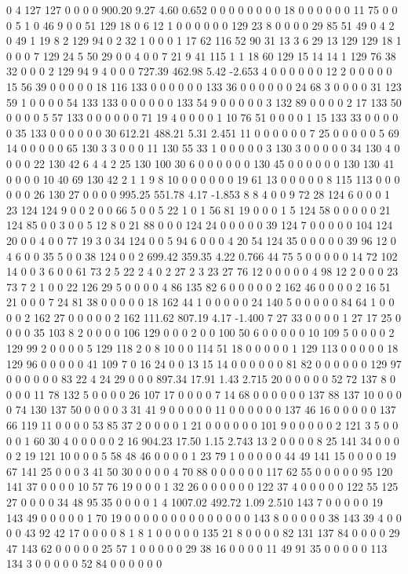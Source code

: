  0 4 127 127 0 0 0 0
900.20 9.27 4.60 0.652
 0 0 0 0 0 0 0 0 18 0 0 0 0 0 0 11 75 0 0 0
 5 1 0 46 9 0 0 51 129 18 0 6 12 1 0 0 0 0 0 0
 129 23 8 0 0 0 0 29 85 51 49 0 4 2 0 49 1 19 8 2
 129 94 0 2 32 1 0 0 0 1 17 62 116 52 90 31 13 3 6 29
 13 129 129 18 1 0 0 0 7 129 24 5 50 29 0 0 4 0 0 7
 21 9 41 115 1 1 18 60 129 15 14 14 1 129 76 38 32 0 0 0
 2 129 94 9 4 0 0 0
727.39 462.98 5.42 -2.653
 4 0 0 0 0 0 0 12 2 0 0 0 0 0 15 56 39 0 0 0
 0 0 18 116 133 0 0 0 0 0 0 133 36 0 0 0 0 0 0 24
 68 3 0 0 0 0 31 123 59 1 0 0 0 0 54 133 133 0 0 0
 0 0 0 133 54 9 0 0 0 0 0 3 132 89 0 0 0 0 2 17
 133 50 0 0 0 0 5 57 133 0 0 0 0 0 0 71 19 4 0 0
 0 0 1 10 76 51 0 0 0 0 1 15 133 33 0 0 0 0 0 35
 133 0 0 0 0 0 0 30
612.21 488.21 5.31 2.451
 11 0 0 0 0 0 0 7 25 0 0 0 0 0 5 69 14 0 0 0
 0 0 65 130 3 3 0 0 0 11 130 55 33 1 0 0 0 0 0 3
 130 3 0 0 0 0 0 34 130 4 0 0 0 0 22 130 42 6 4 4
 2 25 130 100 30 6 0 0 0 0 0 0 130 45 0 0 0 0 0 0
 130 130 41 0 0 0 0 10 40 69 130 42 2 1 1 9 8 10 0 0
 0 0 0 0 19 61 13 0 0 0 0 0 8 115 113 0 0 0 0 0
 0 26 130 27 0 0 0 0
995.25 551.78 4.17 -1.853
 8 8 4 0 0 9 72 28 124 6 0 0 0 1 23 124 124 9 0 0
 2 0 0 66 5 0 0 5 22 1 0 1 56 81 19 0 0 0 1 5
 124 58 0 0 0 0 0 21 124 85 0 0 3 0 0 5 12 8 0 21
 88 0 0 0 124 24 0 0 0 0 0 39 124 7 0 0 0 0 0 104
 124 20 0 0 4 0 0 77 19 3 0 34 124 0 0 5 94 6 0 0
 0 4 20 54 124 35 0 0 0 0 0 39 96 12 0 4 6 0 0 35
 5 0 0 38 124 0 0 2
699.42 359.35 4.22 0.766
 44 75 5 0 0 0 0 0 14 72 102 14 0 0 3 6 0 0 61 73
 2 5 22 2 4 0 2 27 2 3 23 27 76 12 0 0 0 0 0 4
 98 12 2 0 0 0 23 73 7 2 1 0 0 22 126 29 5 0 0 0
 0 4 86 135 82 6 0 0 0 0 0 2 162 46 0 0 0 0 2 16
 51 21 0 0 0 7 24 81 38 0 0 0 0 0 18 162 44 1 0 0
 0 0 0 24 140 5 0 0 0 0 0 84 64 1 0 0 0 0 2 162
 27 0 0 0 0 0 2 162
111.62 807.19 4.17 -1.400
 7 27 33 0 0 0 0 1 27 17 25 0 0 0 0 35 103 8 2 0
 0 0 0 106 129 0 0 0 2 0 0 100 50 6 0 0 0 0 0 10
 109 5 0 0 0 0 2 129 99 2 0 0 0 0 5 129 118 2 0 8
 10 0 0 114 51 18 0 0 0 0 0 1 129 113 0 0 0 0 0 18
 129 96 0 0 0 0 0 41 109 7 0 16 24 0 0 13 15 14 0 0
 0 0 0 0 81 82 0 0 0 0 0 0 129 97 0 0 0 0 0 0
 83 22 4 24 29 0 0 0
897.34 17.91 1.43 2.715
 20 0 0 0 0 0 52 72 137 8 0 0 0 0 11 78 132 5 0 0
 0 0 26 107 17 0 0 0 0 7 14 68 0 0 0 0 0 0 137 88
 137 10 0 0 0 0 74 130 137 50 0 0 0 0 3 31 41 9 0 0
 0 0 0 11 0 0 0 0 0 0 137 46 16 0 0 0 0 0 137 66
 119 11 0 0 0 0 53 85 37 2 0 0 0 0 1 21 0 0 0 0
 0 0 101 9 0 0 0 0 0 2 121 3 5 0 0 0 0 1 60 30
 4 0 0 0 0 0 2 16
904.23 17.50 1.15 2.743
 13 2 0 0 0 0 8 25 141 34 0 0 0 0 2 19 121 10 0 0
 0 5 58 48 46 0 0 0 0 1 23 79 1 0 0 0 0 0 44 49
 141 15 0 0 0 0 19 67 141 25 0 0 0 3 41 50 30 0 0 0
 0 4 70 88 0 0 0 0 0 0 117 62 55 0 0 0 0 0 95 120
 141 37 0 0 0 0 10 57 76 19 0 0 0 1 32 26 0 0 0 0
 0 0 122 37 4 0 0 0 0 0 122 55 125 27 0 0 0 0 34 48
 95 35 0 0 0 0 1 4
1007.02 492.72 1.09 2.510
 143 7 0 0 0 0 0 19 143 49 0 0 0 0 0 1 70 19 0 0
 0 0 0 0 0 0 0 0 0 0 0 0 143 8 0 0 0 0 0 38
 143 39 4 0 0 0 0 43 92 42 17 0 0 0 0 8 1 8 1 0
 0 0 0 0 135 21 8 0 0 0 0 82 131 137 84 0 0 0 0 29
 47 143 62 0 0 0 0 0 25 57 1 0 0 0 0 0 29 38 16 0
 0 0 0 11 49 91 35 0 0 0 0 0 113 134 3 0 0 0 0 0
 52 84 0 0 0 0 0 0
